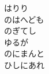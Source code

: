 \documentclass[10pt,b5j]{tarticle} %
\begin{document}
\begin{enumerate}
\begin{minipage}[c]{\blocksize}
        \vspace{\linespace}
        \item
        はりり\\
        のはへども\\
        のぎてし\\
        ゆるが\\
        のにまんと\\
        ひしにあれ
    
    \end{minipage}
\end{enumerate} %
\end{document}

